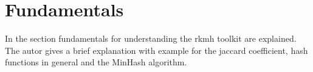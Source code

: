 \section{Fundamentals}

In the section fundamentals for understanding the rkmh toolkit are explained. The autor gives a brief explanation with example for the jaccard coefficient, hash functions in general and the MinHash algorithm.



